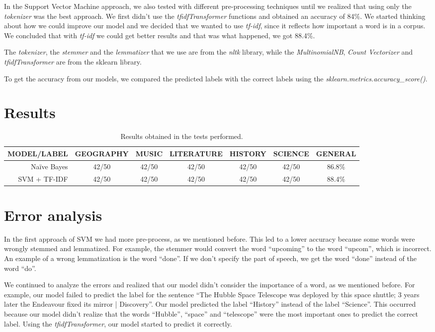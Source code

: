 \documentclass[11pt]{article}
\begin{document}
In the Support Vector Machine approach, we also tested with different pre-processing techniques until we realized that using only the \emph{tokenizer} was the best approach. We first didn’t use the \emph{tfidfTransformer} functions and obtained an accuracy of 84\%. We started thinking about how we could improve our model and we decided that we wanted to use \emph{tf-idf}, since it reflects how important a word is in a corpus. We concluded that with \emph{tf-idf} we could get better results and that was what happened, we got 88.4\%.

The \emph{tokenizer}, the \emph{stemmer} and the \emph{lemmatizer} that we use are from the \emph{nltk} library, while the \emph{MultinomialNB}, \emph{Count Vectorizer} and \emph{tfidfTransformer} are from the sklearn library.

To get the accuracy from our models, we compared the predicted labels with the correct labels using the \emph{sklearn.metrics.accuracy\_score()}.
\newpage
\section{Results}
\begin{table}[!htbp]
    \centering
    \begin{tabular}{r|c|c|c|c|c|c}
    MODEL/LABEL & GEOGRAPHY & MUSIC & LITERATURE & HISTORY & SCIENCE & GENERAL \\\hline
    Naïve Bayes & 42/50 & 42/50 & 42/50 & 42/50 & 42/50 & 86.8\% \\
    SVM + TF-IDF & 42/50 & 42/50 & 42/50 & 42/50 & 42/50 & 88.4\%
    \end{tabular}
    \caption{\label{tab:widgets}Results obtained in the tests performed.}
\end{table}

\section{Error analysis}

In the first approach of SVM we had more pre-process, as we mentioned before. This led to a lower accuracy because some words were wrongly stemmed and lemmatized. For example, the stemmer would convert the word “upcoming” to the word “upcom”, which is incorrect. An example of a wrong lemmatization is the word “done”. If we don’t specify the part of speech, we get the word “done” instead of the word “do”.

We continued to analyze the errors and realized that our model didn’t consider the importance of a word, as we mentioned before. For example, our model failed to predict the label for the sentence “The Hubble Space Telescope was deployed by this space shuttle; 3 years later the Endeavour fixed its mirror | Discovery”. Our model predicted the label “History” instead of the label “Science”. This occurred because our model didn’t realize that the words “Hubble”, “space” and “telescope” were the most important ones to predict the correct label. Using the \emph{tfidfTransformer}, our model started to predict it correctly.
\end{document}
